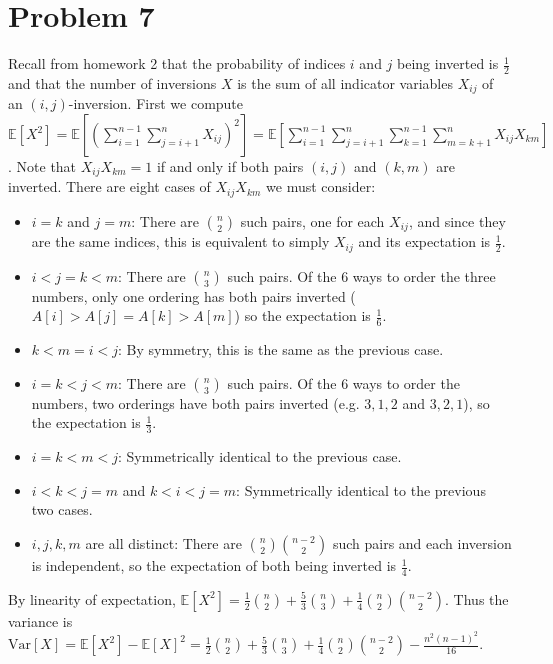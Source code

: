 \documentclass[11pt]{article}
\newcommand{\E}{\mathbb{E}}
\newcommand{\Var}{\text{Var}}
\newcommand{\asdf}{\newline\newline}
\begin{document}
\newpage
\section*{Problem 7}
Recall from homework 2 that the probability of indices $i$ and $j$ being inverted is $\frac12$ and that the number of inversions $X$ is the sum of all indicator variables $X_{ij}$ of an $(i,j)$-inversion. First we compute $\E[X^2] = \E[(\sum_{i=1}^{n-1} \sum_{j=i+1}^n X_{ij})^2] = \E[\sum_{i=1}^{n-1} \sum_{j=i+1}^n \sum_{k=1}^{n-1} \sum_{m=k+1}^n X_{ij}X_{km}]$.\asdf
Note that $X_{ij}X_{km}=1$ if and only if both pairs $(i,j)$ and $(k,m)$ are inverted. There are eight cases of $X_{ij}X_{km}$ we must consider: \begin{itemize}
\item $i=k$ and $j=m$: There are ${n \choose 2}$ such pairs, one for each $X_{ij}$, and since they are the same indices, this is equivalent to simply $X_{ij}$ and its expectation is $\frac12$.
\item $i<j=k<m$: There are ${n \choose 3}$ such pairs. Of the $6$ ways to order the three numbers, only one ordering has both pairs inverted ($A[i] > A[j]=A[k] > A[m]$) so the expectation is $\frac16$.
\item $k<m=i<j$: By symmetry, this is the same as the previous case.
\item $i=k<j<m$: There are ${n \choose 3}$ such pairs. Of the $6$ ways to order the numbers, two orderings have both pairs inverted (e.g. $3,1,2$ and $3,2,1$), so the expectation is $\frac13$.
\item $i=k<m<j$: Symmetrically identical to the previous case.
\item $i<k<j=m$ and $k<i<j=m$: Symmetrically identical to the previous two cases.
\item $i,j,k,m$ are all distinct: There are ${n \choose 2}{n-2 \choose 2}$ such pairs and each inversion is independent, so the expectation of both being inverted is $\frac14$.
\end{itemize}
By linearity of expectation, $\E[X^2] = \frac12{n\choose2}+\frac53{n\choose3}+\frac14{n\choose2}{n-2\choose2}$.\asdf
Thus the variance is $\Var[X]=\E[X^2]-\E[X]^2=\frac12{n\choose2}+\frac53{n\choose3}+\frac14{n\choose2}{n-2\choose2} - \frac{n^2(n-1)^2}{16}$.
\end{document}
